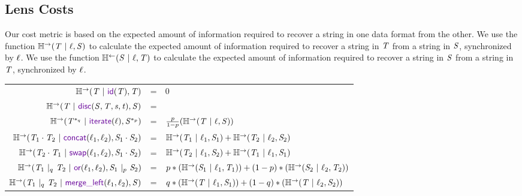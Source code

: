 \documentclass[acmsmall,screen,anonymous]{acmart}
\begin{document}
\subsection{Lens Costs}
Our cost metric is based on the expected amount of information required to
recover a string in one data format from the other. We use the function
$\mathbb{H}^\rightarrow(\mathit{T} ~|~ \mathit{\ell}, \mathit{S})$ to calculate the expected amount
of information required to recover a string in $\mathit{T}$ from a string in
$\mathit{S}$, synchronized by $\mathit{\ell}$. We use the function $\mathbb{H}^\leftarrow(\mathit{S}
  ~|~ \mathit{\ell}, \mathit{T})$ to calculate the expected amount of information
required to recover a string in $\mathit{S}$ from a string in $\mathit{T}$,
synchronized by $\mathit{\ell}$.
\begin{center}
  \begin{tabular}{rcl}
    $\REntropyOf{\RegexAlt \Given \IdentityLensOf{\RegexAlt}, \RegexAlt}$
    & =
    & 0\\
    
    $\REntropyOf{\RegexAlt \Given \DisconnectOf{\Regex}{\RegexAlt}{\String}{\StringAlt}, \Regex}$
    & =
    & \EntropyOf{\RegexAlt}\\

    $\REntropyOf{\PRegexStar{\RegexAlt}{\ProbabilityAlt} \Given \IterateLensOf{\Lens}, \PRegexStar{\Regex}{\Probability}}$
    & =
    & $\frac{p}{1-p}(\mathbb{H}^\rightarrow(\mathit{T} ~|~ \mathit{\ell}, \mathit{S}))$\\
    
    $\REntropyOf{\RegexAlt_1 \Concat \RegexAlt_2 \Given \ConcatLensOf{\Lens_1}{\Lens_2}, \Regex_1 \Concat \Regex_2}$
    & =
    & $\mathbb{H}^\rightarrow(\mathit{T}_1 ~|~ \mathit{\ell}_1, \mathit{S}_1) + \mathbb{H}^\rightarrow(\mathit{T}_2 ~|~ \mathit{\ell}_2, \mathit{S}_2)$\\
    
    $\REntropyOf{\RegexAlt_2 \Concat \RegexAlt_1 \Given \SwapLensOf{\Lens_1}{\Lens_2}, \Regex_1 \Concat \Regex_2}$
    & =
    & $\mathbb{H}^\rightarrow(\mathit{T}_2 ~|~ \mathit{\ell}_1, \mathit{S}_2) + \mathbb{H}^\rightarrow(\mathit{T}_1 ~|~ \mathit{\ell}_1, \mathit{S}_1)$\\
    
    $\REntropyOf{\PRegexOr{\RegexAlt_1}{\RegexAlt_2}{\ProbabilityAlt} \Given \OrLensOf{\Lens_1}{\Lens_2}, \PRegexOr{\Regex_1}{\Regex_2}{\Probability}}$
    & =
    & $p*(\mathbb{H}^\rightarrow(\mathit{S}_1 ~|~ \mathit{\ell}_1, \mathit{T}_1) ) + (1-p)*(\mathbb{H}^\rightarrow(\mathit{S}_2 ~|~ \mathit{\ell}_2, \mathit{T}_2))$\\
    
    $\REntropyOf{\PRegexOr{\RegexAlt_1}{\RegexAlt_2}{\ProbabilityAlt} \Given \MergeLOf{\Lens_1}{\Lens_2}, \Regex}$
    & =
    & $q*(\mathbb{H}^\rightarrow(\mathit{T} ~|~ \mathit{\ell}_1, \mathit{S}_1)) + (1-q)*(\mathbb{H}^\rightarrow(\mathit{T} ~|~ \mathit{\ell}_2, \mathit{S}_2))$\\
    

\end{tabular}
\end{center}
\end{document}
